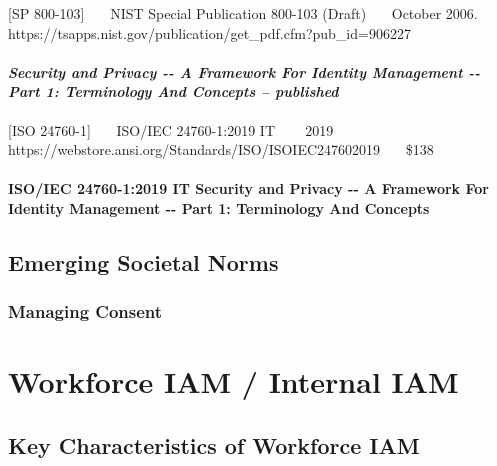 {[}SP 800-103{]}~~~ NIST Special Publication 800-103 (Draft)~~~ October
2006.~~~
https://tsapps.nist.gov/publication/get\_pdf.cfm?pub\_id=906227~~~

\hypertarget{security-and-privacy----a-framework-for-identity-management----part-1-terminology-and-concepts-published}{%
\subsubsection{\texorpdfstring{\emph{Security and Privacy -\/- A Framework
For Identity Management -\/- Part 1: Terminology And Concepts --
published}}{Security and Privacy -\/- A Framework For Identity Management -\/- Part 1: Terminology And Concepts -- published}}\label{security-and-privacy----a-framework-for-identity-management----part-1-terminology-and-concepts-published}}

{[}ISO 24760-1{]}~~~ ISO/IEC 24760-1:2019 IT ~~~ 2019~~~
https://webstore.ansi.org/Standards/ISO/ISOIEC247602019~~~ \$138

\hypertarget{isoiec-24760-12019-it-security-and-privacy----a-framework-for-identity-management----part-1-terminology-and-concepts}{%
\subsubsection{ISO/IEC 24760-1:2019 IT Security and Privacy -\/- A Framework
For Identity Management -\/- Part 1: Terminology And
Concepts}\label{isoiec-24760-12019-it-security-and-privacy----a-framework-for-identity-management----part-1-terminology-and-concepts}}

\hypertarget{emerging-societal-norms}{%
\section{Emerging Societal Norms}\label{emerging-societal-norms}}

\hypertarget{managing-consent}{%
\subsection{Managing Consent }\label{managing-consent}}

\hypertarget{workforce-iam-internal-iam}{%
\chapter{Workforce IAM / Internal
IAM}\label{workforce-iam-internal-iam}}

\hypertarget{key-characteristics-of-workforce-iam}{%
\section{Key Characteristics of Workforce
IAM}\label{key-characteristics-of-workforce-iam}}


